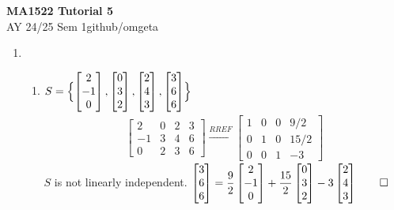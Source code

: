 \documentclass[12pt, a4paper]{article}
\newcommand{\mytitle}{MA1522 Tutorial 5}
\newcommand{\myauthor}{github/omgeta}
\newcommand{\mydate}{AY 24/25 Sem 1}
\begin{document}
\raggedright
\footnotesize
\begin{center}
{\normalsize{\textbf{\mytitle}}} \\
{\footnotesize{\mydate\hspace{2pt}\textemdash\hspace{2pt}\myauthor}}
\end{center}

\begin{enumerate}[Q\arabic*.]
  \item 
    \begin{enumerate}[(\alph*)]
      \item $S = \Bigl\{\begin{bmatrix}2\\-1\\0\end{bmatrix}, \begin{bmatrix}0\\3\\2\end{bmatrix}, \begin{bmatrix}2\\4\\3\end{bmatrix}, \begin{bmatrix}3\\6\\6\end{bmatrix}\Bigr\}$ 
      \begin{align*}
        \begin{bmatrix}
          2 & 0 & 2 & 3\\
          -1 & 3 & 4 & 6\\
          0 & 2 & 3 & 6
        \end{bmatrix}\xrightarrow{RREF}
        \begin{bmatrix}
          1 & 0 & 0 & 9 /2\\
          0 & 1 & 0 & 15 /2\\
          0 & 0 & 1 & -3
        \end{bmatrix}
      \end{align*}
      $S$ is not linearly independent. $\displaystyle \begin{bmatrix}3\\6\\6\end{bmatrix} = \frac{9}{2}\begin{bmatrix}2\\-1\\0\end{bmatrix} + \frac{15}{2}\begin{bmatrix}0\\3\\2\end{bmatrix} -3\begin{bmatrix}2\\4\\3\end{bmatrix} \qed$


\end{enumerate}
\end{enumerate}
\end{document}
